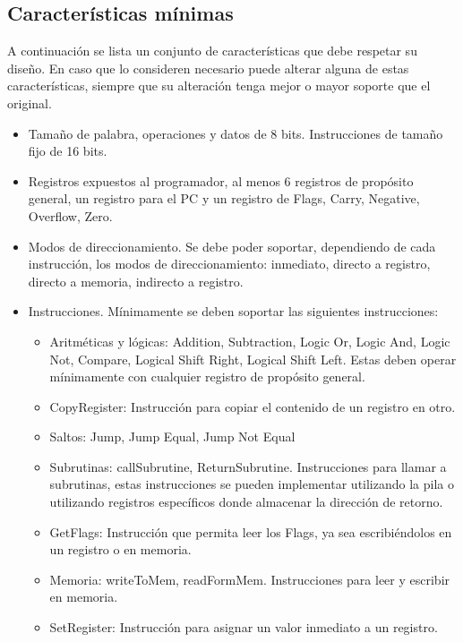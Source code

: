 \documentclass[a4paper,11pt]{article}
\begin{document}
\subsection{Características mínimas}

A continuación se lista un conjunto de características que debe respetar su diseño.
En caso que lo consideren necesario puede alterar alguna de estas características, siempre que su alteración tenga mejor o mayor soporte que el original.

\begin{itemize}

\item Tamaño de palabra, operaciones y datos de 8 bits. Instrucciones de tamaño fijo de 16 bits.
\item Registros expuestos al programador, al menos 6 registros de propósito general, un registro para el PC y un registro de Flags, Carry, Negative, Overflow, Zero.

\item Modos de direccionamiento. Se debe poder soportar, dependiendo de cada instrucción, los modos de direccionamiento: inmediato, directo a registro, directo a memoria, indirecto a registro.

\item Instrucciones. Mínimamente se deben soportar las siguientes instrucciones:
\begin{itemize}
    \item Aritméticas y lógicas: Addition, Subtraction, Logic Or, Logic And, Logic Not, Compare, Logical Shift Right, Logical Shift Left. Estas deben operar mínimamente con cualquier registro de propósito general.
    \item CopyRegister: Instrucción para copiar el contenido de un registro en otro.
    \item Saltos: Jump, Jump Equal, Jump Not Equal
    \item Subrutinas: callSubrutine, ReturnSubrutine. Instrucciones para llamar a subrutinas, estas instrucciones se pueden implementar utilizando la pila o utilizando registros específicos donde almacenar la dirección de retorno.
    \item GetFlags: Instrucción que permita leer los Flags, ya sea escribiéndolos en un registro o en memoria.
    \item Memoria: writeToMem, readFormMem. Instrucciones para leer y escribir en memoria.
    \item SetRegister: Instrucción para asignar un valor inmediato a un registro.
\end{itemize}


\end{itemize}
\end{document}
